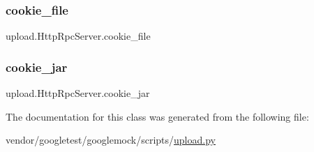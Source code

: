\subsubsection{\texorpdfstring{cookie\+\_\+file}{cookie\_file}}
{\footnotesize\ttfamily upload.\+Http\+Rpc\+Server.\+cookie\+\_\+file}

\mbox{\label{classupload_1_1_http_rpc_server_a1b9c9af7f0a46afd84a9d524782323bf}} 
\subsubsection{\texorpdfstring{cookie\+\_\+jar}{cookie\_jar}}
{\footnotesize\ttfamily upload.\+Http\+Rpc\+Server.\+cookie\+\_\+jar}



The documentation for this class was generated from the following file\+:\begin{DoxyCompactItemize}
\item 
vendor/googletest/googlemock/scripts/\hyperlink{googlemock_2scripts_2upload_8py}{upload.\+py}\end{DoxyCompactItemize}
